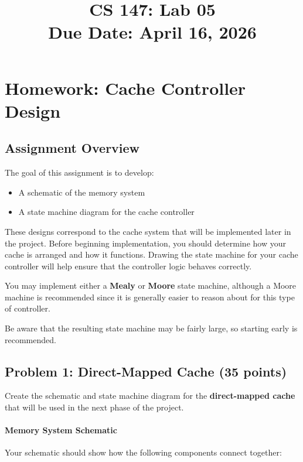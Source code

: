\documentclass[12pt]{article}
\title{CS 147: Lab 05 \\ Due Date: April 16, 2026}
\author{}
\date{}
\begin{document}
\frenchspacing
\maketitle

\section*{Homework: Cache Controller Design}

\subsection*{Assignment Overview}

The goal of this assignment is to develop:

\begin{itemize}
\item A schematic of the memory system
\item A state machine diagram for the cache controller
\end{itemize}

These designs correspond to the cache system that will be implemented later in the project.
Before beginning implementation, you should determine how your cache is arranged and how it functions.
Drawing the state machine for your cache controller will help ensure that the controller logic behaves correctly.

You may implement either a \textbf{Mealy} or \textbf{Moore} state machine, although a Moore machine is recommended since it is generally easier to reason about for this type of controller.

Be aware that the resulting state machine may be fairly large, so starting early is recommended.

\subsection*{Problem 1: Direct-Mapped Cache (35 points)}

Create the schematic and state machine diagram for the \textbf{direct-mapped cache} that will be used in the next phase of the project.

\paragraph{Memory System Schematic}

Your schematic should show how the following components connect together:
\end{document}
